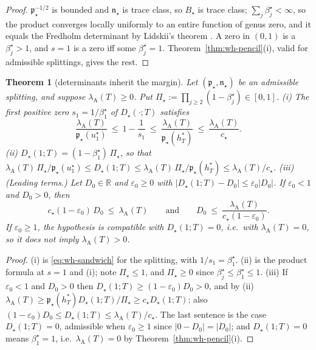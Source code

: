 \documentclass[11pt]{amsart}
\newtheorem{theorem}{Theorem}[section]
\theoremstyle{definition}
\theoremstyle{remark}
\newcommand{\R}{\mathbb R}
\newcommand{\lamA}{\lambda_{\mathrm A}(T)}
\begin{document}
\begin{proof}
$\mathfrak p_\star^{-1/2}$ is bounded and $\mathfrak n_\star$ is trace class, so $B_\star$ is trace class; $\sum_j\beta^\star_j<\infty$, so the
product converges locally uniformly to an entire function of genus zero, and it equals the Fredholm
determinant by Lidskii's theorem \cite[Thm.~3.7]{Simon2005}. A zero in $(0,1)$ is a $\beta^\star_j>1$, and $s=1$ is
a zero iff some $\beta^\star_j=1$. Theorem~\ref{thm:wh-pencil}(i), valid for admissible splittings, gives the rest.
\end{proof}

\begin{theorem}[determinants inherit the margin]\label{thm:wh-detinherit}
Let $(\mathfrak p_\star,\mathfrak n_\star)$ be an admissible splitting, and suppose $\lamA\ge0$. Put
$\Pi_\star:=\prod_{j\ge2}(1-\beta^\star_j)\in[0,1]$.
\emph{(i)} The first positive zero $s_1=1/\beta^\star_1$ of $D_\star(\cdot;T)$ satisfies
\[
\frac{\lamA}{\mathfrak p_\star(u^\star_1)}\ \le\ 1-\frac1{s_1}\ \le\ \frac{\lamA}{\mathfrak p_\star(h^*_T)}\ \le\ \frac{\lamA}{c_\star}.
\]
\emph{(ii)} $D_\star(1;T)=(1-\beta^\star_1)\,\Pi_\star$, so that
$\lamA\,\Pi_\star/\mathfrak p_\star(u^\star_1)\le D_\star(1;T)\le\lamA\,\Pi_\star/\mathfrak p_\star(h^*_T)\le\lamA/c_\star$.
\emph{(iii) (Leading terms.)} Let $D_0\in\R$ and $\varepsilon_0\ge0$ with $|D_\star(1;T)-D_0|\le\varepsilon_0|D_0|$. If
$\varepsilon_0<1$ and $D_0>0$, then
\[
c_\star(1-\varepsilon_0)\,D_0\ \le\ \lamA\qquad\text{and}\qquad D_0\ \le\ \frac{\lamA}{c_\star(1-\varepsilon_0)} .
\]
If $\varepsilon_0\ge1$, the hypothesis is compatible with $D_\star(1;T)=0$, i.e.\ with $\lamA=0$, so it does not
imply $\lamA>0$.
\end{theorem}

\begin{proof}
(i) is \eqref{eq:wh-sandwich} for the splitting, with $1/s_1=\beta^\star_1$. (ii) is the product formula at $s=1$
and (i); note $\Pi_\star\le1$, and $\Pi_\star\ge0$ since $\beta^\star_j\le\beta^\star_1\le1$. (iii) If $\varepsilon_0<1$ and $D_0>0$ then
$D_\star(1;T)\ge(1-\varepsilon_0)D_0>0$, and by (ii) $\lamA\ge\mathfrak p_\star(h^*_T)D_\star(1;T)/\Pi_\star\ge c_\star D_\star(1;T)$; also
$(1-\varepsilon_0)D_0\le D_\star(1;T)\le\lamA/c_\star$. The last sentence is the case $D_\star(1;T)=0$, admissible when
$\varepsilon_0\ge1$ since $|0-D_0|=|D_0|$; and $D_\star(1;T)=0$ means $\beta^\star_1=1$, i.e.\ $\lamA=0$ by Theorem~\ref{thm:wh-pencil}(i).
\end{proof}
\end{document}
